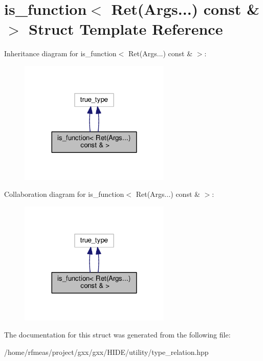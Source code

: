 \hypertarget{structis__function_3_01Ret_07Args_8_8_8_08_01const_01_6_01_4}{}\section{is\+\_\+function$<$ Ret(Args...) const \& $>$ Struct Template Reference}
\label{structis__function_3_01Ret_07Args_8_8_8_08_01const_01_6_01_4}


Inheritance diagram for is\+\_\+function$<$ Ret(Args...) const \& $>$\+:
\nopagebreak
\begin{figure}[H]
\begin{center}
\leavevmode
\includegraphics[width=204pt]{structis__function_3_01Ret_07Args_8_8_8_08_01const_01_6_01_4__inherit__graph}
\end{center}
\end{figure}


Collaboration diagram for is\+\_\+function$<$ Ret(Args...) const \& $>$\+:
\nopagebreak
\begin{figure}[H]
\begin{center}
\leavevmode
\includegraphics[width=204pt]{structis__function_3_01Ret_07Args_8_8_8_08_01const_01_6_01_4__coll__graph}
\end{center}
\end{figure}


The documentation for this struct was generated from the following file\+:\begin{DoxyCompactItemize}
\item 
/home/rfmeas/project/gxx/gxx/\+H\+I\+D\+E/utility/type\+\_\+relation.\+hpp\end{DoxyCompactItemize}
